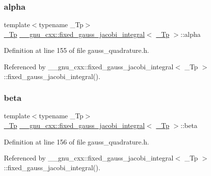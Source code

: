 \subsubsection{\texorpdfstring{alpha}{alpha}}
{\footnotesize\ttfamily template$<$typename \+\_\+\+Tp$>$ \\
\hyperlink{namespace____gnu__cxx_a3b19a9c800ca194374ef9172290f7d79}{\+\_\+\+Tp} \hyperlink{struct____gnu__cxx_1_1fixed__gauss__jacobi__integral}{\+\_\+\+\_\+gnu\+\_\+cxx\+::fixed\+\_\+gauss\+\_\+jacobi\+\_\+integral}$<$ \hyperlink{namespace____gnu__cxx_a3b19a9c800ca194374ef9172290f7d79}{\+\_\+\+Tp} $>$\+::alpha}



Definition at line 155 of file gauss\+\_\+quadrature.\+h.



Referenced by \+\_\+\+\_\+gnu\+\_\+cxx\+::fixed\+\_\+gauss\+\_\+jacobi\+\_\+integral$<$ \+\_\+\+Tp $>$\+::fixed\+\_\+gauss\+\_\+jacobi\+\_\+integral().

\mbox{\label{struct____gnu__cxx_1_1fixed__gauss__jacobi__integral_aa9e160852c8912532deda29fae96824a}} 
\subsubsection{\texorpdfstring{beta}{beta}}
{\footnotesize\ttfamily template$<$typename \+\_\+\+Tp$>$ \\
\hyperlink{namespace____gnu__cxx_a3b19a9c800ca194374ef9172290f7d79}{\+\_\+\+Tp} \hyperlink{struct____gnu__cxx_1_1fixed__gauss__jacobi__integral}{\+\_\+\+\_\+gnu\+\_\+cxx\+::fixed\+\_\+gauss\+\_\+jacobi\+\_\+integral}$<$ \hyperlink{namespace____gnu__cxx_a3b19a9c800ca194374ef9172290f7d79}{\+\_\+\+Tp} $>$\+::beta}



Definition at line 156 of file gauss\+\_\+quadrature.\+h.



Referenced by \+\_\+\+\_\+gnu\+\_\+cxx\+::fixed\+\_\+gauss\+\_\+jacobi\+\_\+integral$<$ \+\_\+\+Tp $>$\+::fixed\+\_\+gauss\+\_\+jacobi\+\_\+integral().

